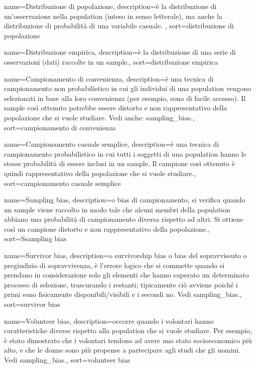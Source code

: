{
	 name={Distribuzione di popolazione},
	 description={\`e la distribuzione di un'osservazione nella \gls{population} (inteso in senso letterale), ma anche la distribuzione di probabilit\`a di una variabile casuale.
	},
	 sort={distribuzione di popolazione}
}

{
	 name={Distribuzione empirica},
	 description={\`e la distribuzione di una serie di osservazioni (dati) raccolte in un \gls{sample}.},
	 sort={distribuzione empirica}
}

{
	 name={Campionamento di convenienza},
	 description={\`e una tecnica di campionamento non probabilistico in cui gli individui di una \gls{population} vengono selezionati in base alla loro convenienza (per esempio, sono di facile accesso). Il \gls{sample} cos\`i ottenuto potrebbe essere distorto e non rappresentativo della popolazione che si vuole studiare. Vedi anche: \gls{sampling_bias}.},
	 sort={campionamento di convenienza}
}

{
	 name={Campionamento casuale semplice},
	 description={\`e una tecnica di campionamento probabilistico in cui tutti i soggetti di una \gls{population} hanno le stesse probabilità di essere inclusi in un \gls{sample}. Il campione cos\`i ottenuto \`e quindi rappresentativo della popolazione che si vuole studiare.},
	 sort={campionamento casuale semplice}
}

{
	 name={Sampling bias},
	 description={o bias di campionamento, si verifica quando un \gls{sample} viene raccolto in modo tale che alcuni membri della \gls{population} abbiano una probabilit\`a di campionamento diversa rispetto ad altri. Si ottiene cos\`i un campione distorto e non rappresentativo della popolazione.},
	 sort={Ssampling bias}
}

{
	 name={Survivor bias},
	 description={o survivorship bias o bias del sopravvissuto o pregiudizio di sopravvivenza, \`e l'errore logico che si commette quando si prendano in considerazione solo gli elementi che hanno superato un determinato processo di selezione, trascurando i restanti; tipicamente ciò avviene poiché i primi sono fisicamente disponibili/visibili e i secondi no. Vedi \gls{sampling_bias}.},
	 sort={survivor bias}
}

{
	 name={Volunteer bias},
	 description={occorre quando i volontari hanno caratteristiche diverse rispetto alla \gls{population} che si vuole studiare. Per esempio, \`e stato dimostrato che i volontari tendono ad avere uno stato socioeconomico pi\`u alto, e che le donne sono pi\`u propense a partecipare agli studi che gli uomini. Vedi \gls{sampling_bias}.},
	 sort={volunteer bias}
}

